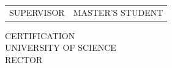 \vspace{1.5em}
\noindent\begin{tabularx}{\textwidth}{@{}XX@{}}
\centering SUPERVISOR & \centering\arraybackslash MASTER'S STUDENT \\
\end{tabularx}

\vspace{4em}
\begin{center}
CERTIFICATION\\ UNIVERSITY OF SCIENCE\\ RECTOR
\end{center}
\clearpage
